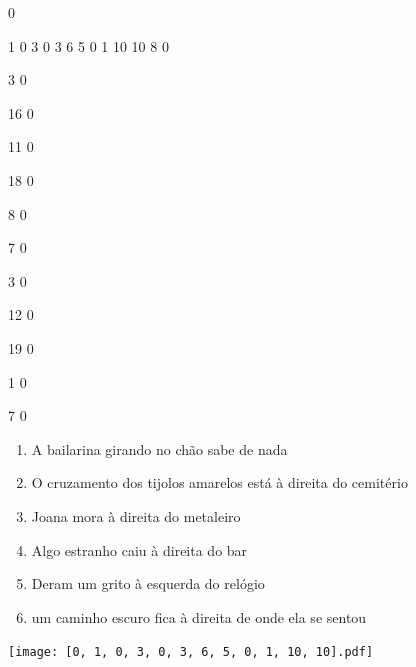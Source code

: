 \documentclass[12pt]{article}
\begin{document}
		\vfill  
		  
{
	0	%

	1	%
	0	%
	3	%
	0	%
	3	%
	6	%
	5	%
	0	%
	1	%
	10	%
	10	%
	8	%
	0	%

	3	%
	0	%

	16	%
	0	%

	11	%
	0	%

	18	%
	0	%

	8	%
	0	%

	7	%
	0	%

	3	%
	0	%

	12	%
	0	%

	19	%
	0	%

	1	%
	0	%

	7	%
	0	%

}	  
		    	

		 

\pagebreak


	\begin{enumerate}
		  \sffamily %
		  \large %


\vfill \item
A bailarina girando no chão	%
sabe de nada	%

\vfill \item
O cruzamento dos tijolos amarelos está	%
à direita
do cemitério	%

\vfill \item
Joana mora	%
à direita
do metaleiro	%

\vfill \item
Algo estranho caiu	%
à direita
do bar	%

\vfill \item
Deram um grito	%
à esquerda
do relógio	%

\vfill \item
um caminho escuro fica	%
à direita
de onde ela se sentou	%
	\end{enumerate}
		  
		  \hfill

		  \vfill

\texttt{[image: [0, 1, 0, 3, 0, 3, 6, 5, 0, 1, 10, 10].pdf]}
\end{document}
